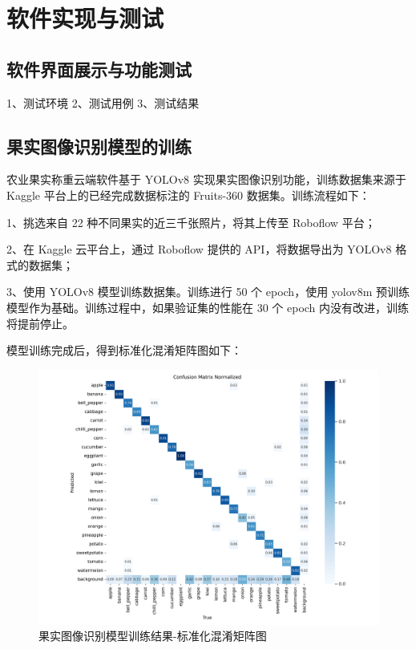 \chapter{软件实现与测试}

\section{软件界面展示与功能测试}

1、测试环境
2、测试用例
3、测试结果

\section{果实图像识别模型的训练}

农业果实称重云端软件基于 YOLOv8 实现果实图像识别功能，训练数据集来源于 Kaggle 平台上的已经完成数据标注的 Fruits-360 数据集。训练流程如下：

1、挑选来自 22 种不同果实的近三千张照片，将其上传至 Roboflow 平台；

2、在 Kaggle 云平台上，通过 Roboflow 提供的 API，将数据导出为 YOLOv8 格式的数据集；

3、使用 YOLOv8 模型训练数据集。训练进行 50 个 epoch，使用 yolov8m 预训练模型作为基础。训练过程中，如果验证集的性能在 30 个 epoch 内没有改进，训练将提前停止。

模型训练完成后，得到标准化混淆矩阵图如下：

\begin{figure}[H]
    \centering
    \includegraphics[width=0.8\linewidth]{../source/aws-img/yolov8/out/image/confusion_matrix_normalized.png}
    \caption{果实图像识别模型训练结果-标准化混淆矩阵图}
    \label{fig:confusion_matrix_normalized}
\end{figure}

